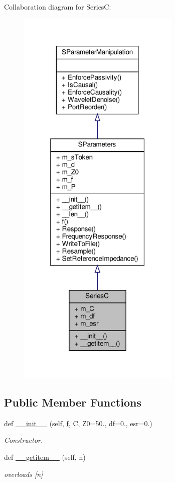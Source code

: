Collaboration diagram for SeriesC\+:\nopagebreak
\begin{figure}[H]
\begin{center}
\leavevmode
\includegraphics[width=220pt]{classSignalIntegrity_1_1SParameters_1_1Devices_1_1SeriesC_1_1SeriesC__coll__graph}
\end{center}
\end{figure}
\subsection*{Public Member Functions}
\begin{DoxyCompactItemize}
\item 
def \hyperlink{classSignalIntegrity_1_1SParameters_1_1Devices_1_1SeriesC_1_1SeriesC_a441cc92ccb545fe35cb1959bbef689b0}{\+\_\+\+\_\+init\+\_\+\+\_\+} (self, \hyperlink{classSignalIntegrity_1_1SParameters_1_1SParameters_1_1SParameters_a32e7a34d6837fe949b413c852a0447f8}{f}, C, Z0=50., df=0., esr=0.)
\begin{DoxyCompactList}\small\item\em Constructor. \end{DoxyCompactList}\item 
def \hyperlink{classSignalIntegrity_1_1SParameters_1_1Devices_1_1SeriesC_1_1SeriesC_ab7a6da5139e0878b590d68292aaa70f2}{\+\_\+\+\_\+getitem\+\_\+\+\_\+} (self, n)
\begin{DoxyCompactList}\small\item\em overloads \mbox{[}n\mbox{]} \end{DoxyCompactList}\end{DoxyCompactItemize}


